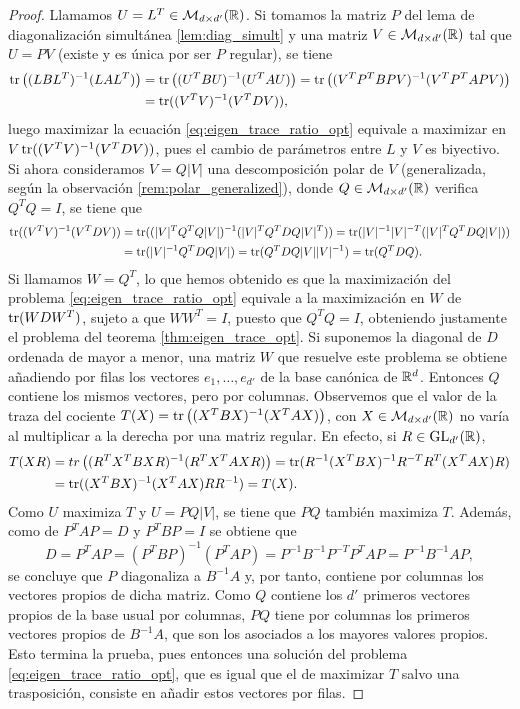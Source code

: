 \begin{proof}
    Llamamos $U = L^T \in \mathcal{M}_{d\times d'}(\mathbb{R})$. Si tomamos la matriz $P$ del lema de diagonalización simultánea \ref{lem:diag_simult} y una matriz $V \in \mathcal{M}_{d\times d'}(\mathbb{R})$ tal que $U = PV$ (existe y es única por ser $P$ regular), se tiene 
    \begin{align*}
        \operatorname{tr}\left((LBL^T)^{-1}(LAL^T)\right) &= \operatorname{tr}\left((U^TBU)^{-1}(U^TAU)\right) = \operatorname{tr}\left((V^TP^TBPV)^{-1}(V^TP^TAPV)\right) \\
        &=\operatorname{tr}((V^TV)^{-1}(V^TDV)),
    \end{align*}
    luego maximizar la ecuación \ref{eq:eigen_trace_ratio_opt} equivale a maximizar en $V$ $\operatorname{tr}((V^TV)^{-1}(V^TDV))$, pues el cambio de parámetros entre $L$ y $V$ es biyectivo. Si ahora consideramos $V = Q|V|$ una descomposición polar de $V$ (generalizada, según la observación \ref{rem:polar_generalized}), donde $Q \in \mathcal{M}_{d\times d'}(\mathbb{R})$ verifica $Q^TQ=I$, se tiene que
    \begin{align*}
        \operatorname{tr}((V^TV)^{-1}(V^TDV)) &= \operatorname{tr}((|V|^TQ^TQ|V|)^{-1}(|V|^TQ^TDQ|V|^T)) = \operatorname{tr}(|V|^{-1}|V|^{-T}(|V|^TQ^TDQ|V|))\\
                                &= \operatorname{tr}(|V|^{-1}Q^TDQ|V|) = \operatorname{tr}(Q^TDQ|V||V|^{-1}) = \operatorname{tr}(Q^TDQ).
    \end{align*}
    Si llamamos $W = Q^T$, lo que hemos obtenido es que la maximización del problema \ref{eq:eigen_trace_ratio_opt} equivale a la maximización en $W$ de $\operatorname{tr}(WDW^T)$, sujeto a que $WW^T = I$, puesto que $Q^TQ = I$, obteniendo justamente el problema del teorema \ref{thm:eigen_trace_opt}. Si suponemos la diagonal de $D$ ordenada de mayor a menor, una matriz $W$ que resuelve este problema se obtiene añadiendo por filas los vectores $e_1,\dots,e_{d'}$ de la base canónica de $\mathbb{R}^d$. Entonces $Q$ contiene los mismos vectores, pero por columnas. Observemos que el valor de la traza del cociente $T(X) = \operatorname{tr}\left((X^TBX)^{-1}(X^TAX)\right)$, con $X \in \mathcal{M}_{d \times d'}(\mathbb{R})$ no varía al multiplicar a la derecha por una matriz regular. En efecto, si $R \in \operatorname{GL}_{d'}(\mathbb{R})$,
    \begin{align*}
        T(XR) &= tr\left((R^TX^TBXR)^{-1}(R^TX^TAXR)\right) = \operatorname{tr}(R^{-1}(X^TBX)^{-1}R^{-T}R^T(X^TAX)R) \\
              &= \operatorname{tr}((X^TBX)^{-1}(X^TAX)RR^{-1}) = T(X).
    \end{align*}
    Como $U$ maximiza $T$ y $U = PQ|V|$, se tiene que $PQ$ también maximiza $T$. Además, como de $P^TAP = D$ y $P^TBP = I$ se obtiene que
    \[ D = P^TAP = (P^TBP)^{-1}(P^TAP) = P^{-1}B^{-1}P^{-T}P^TAP = P^{-1}B^{-1}AP, \]
    se concluye que $P$ diagonaliza a $B^{-1}A$ y, por tanto, contiene por columnas los vectores propios de dicha matriz. Como $Q$ contiene los $d'$ primeros vectores propios de la base usual por columnas, $PQ$ tiene por columnas los primeros vectores propios de $B^{-1}A$, que son los asociados a los mayores valores propios. Esto termina la prueba, pues entonces una solución del problema \ref{eq:eigen_trace_ratio_opt}, que es igual que el de maximizar $T$ salvo una trasposición, consiste en añadir estos vectores por filas.
\end{proof}

